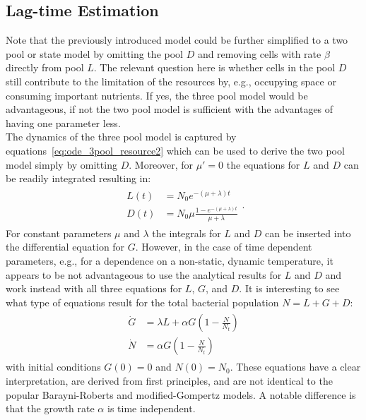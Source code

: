 \documentclass[10pt,A4paper]{article}
\numberwithin{equation}{section}
\begin{document}
\subsection{Lag-time Estimation}
Note that the previously introduced model could be further simplified to a two pool or state model by omitting the pool $D$ and removing cells with rate $\beta$ directly from pool $L$.
The relevant question here is whether cells in the pool $D$ still contribute to the limitation of the resources by, e.g., occupying space or consuming important nutrients.
If yes, the three pool model would be advantageous, if not the two pool model is sufficient with the advantages of having one parameter less.\\
%
The dynamics of the three pool model is captured by equations~\ref{eq:ode_3pool_resource2} which can be used to derive the two pool model simply by omitting $D$.
Moreover, for $\mu'=0$ the equations for $L$ and $D$ can be readily integrated resulting in:
\begin{align}
    \begin{split}
        L(t) &= N_0 e^{-(\mu+\lambda)t}\\
        D(t) &= N_0 \mu \frac{1-e^{-(\mu+\lambda)t}}{\mu+\lambda
       }
    \end{split}.
\end{align}
For constant parameters $\mu$ and $\lambda$ the integrals for $L$ and $D$ can be inserted into the differential equation for $G$.
However, in the case of time dependent parameters, e.g., for a dependence on a non-static, dynamic temperature, it appears to be not advantageous to use the analytical results for $L$ and $D$ and work instead with all three equations for $L$, $G$, and $D$.
It is interesting to see what type of equations result for the total bacterial population $N=L+G+D$:
\begin{align}
    \begin{split}
        \dot{G} &= \lambda L + \alpha G\left(1-\frac{N}{N_t}\right)\\
        \dot{N} &= \alpha G\left(1-\frac{N}{N_t}\right)
    \end{split}
\end{align}
with initial conditions $G(0)=0$ and $N(0)=N_0$.
These equations have a clear interpretation, are derived from first principles, and are not identical to the popular Barayni-Roberts and modified-Gompertz models.
A notable difference is that the growth rate $\alpha$ is time independent.
\end{document}
